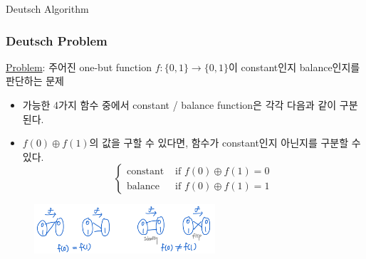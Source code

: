 \documentclass[9pt]{beamer}
\begin{document}
    \begin{section}{Deutsch Algorithm}
        \begin{frame}
            \frametitle{Deutsch Problem}
            \underline{Problem}: 주어진 one-but function $f: \{0, 1\} \rightarrow \{0, 1\}$이 constant인지 balance인지를 판단하는 문제
            \vspace{0.2cm}
            \begin{itemize}
                \item 가능한 4가지 함수 중에서 constant / balance function은 각각 다음과 같이 구분된다.
                \item $f(0) \oplus f(1)$의 값을 구할 수 있다면, 함수가 constant인지 아닌지를 구분할 수 있다.
                $$ \begin{cases} \text{constant} & \text{ if } f(0)\oplus f(1) = 0  \\ \text{balance} & \text{ if } f(0)\oplus f(1) = 1 \end{cases}$$
            \end{itemize}
            \begin{figure}
                \includegraphics[width=0.6\textwidth]{image/L2_Deutsh.png}
            \end{figure}
        \end{frame}


\end{section}
\end{document}
